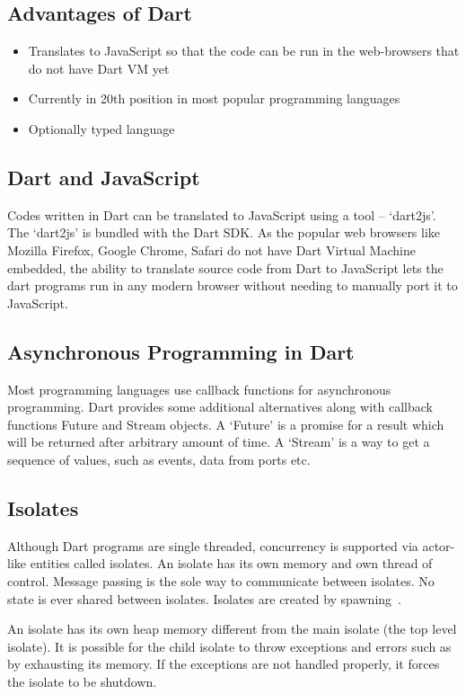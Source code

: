   \subsection{Advantages of Dart}
  \begin{itemize}
    \item Translates to JavaScript so that the code can be run in the web-browsers that do not have Dart VM yet
    \item Currently in 20th position in most popular programming languages
    \item Optionally typed language
\end{itemize}

  \subsection{Dart and JavaScript}
  Codes written in Dart can be translated to JavaScript using a tool – ‘dart2js’. The ‘dart2js’ is bundled with the Dart SDK. As the popular web browsers like Mozilla Firefox, Google Chrome, Safari do not have Dart Virtual Machine embedded, the ability to translate source code from Dart to JavaScript lets the dart programs run in any modern browser without needing to manually port it to JavaScript.

  \subsection{Asynchronous Programming in Dart}
  Most programming languages use callback functions for asynchronous programming. Dart provides some additional alternatives along with callback functions \textendash Future and Stream objects. A ‘Future’ is a promise for a result which will be returned after arbitrary amount of time. A ‘Stream’ is a way to get a sequence of values, such as events, data from ports etc.

  \subsection{Isolates}
  \label{sec:isolates}
  Although Dart programs are single threaded, concurrency is supported via actor-like entities called isolates. An isolate has its own memory and own thread of control. Message passing is the sole way to communicate between isolates. No state is ever shared between isolates. Isolates are created by spawning~\cite{dartEcma}.

  An isolate has its own heap memory different from the main isolate (the top level isolate). It is possible for the child isolate to throw exceptions and errors such as by exhausting its memory. If the exceptions are not handled properly, it forces the isolate to be shutdown.

